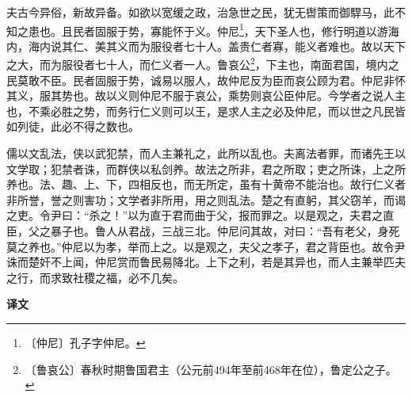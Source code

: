 \documentclass[12pt,UTF-8,openany,a4]{ctexbook}
\begin{document}
\begin{large}
    夫古今异俗，新故异备。如欲以宽缓之政，治急世之民，犹无辔策而御駻马，此不知之患也。且民者固服于势，寡能怀于义。仲尼\footnote{〔仲尼〕\yiwen 孔子字仲尼。}，天下圣人也，修行明道以游海内，海内说其仁、美其义而为服役者七十人。盖贵仁者寡，能义者难也。故以天下之大，而为服役者七十人，而仁义者一人。鲁哀公\footnote{〔鲁哀公〕\yiwen 春秋时期鲁国君主（公元前494年至前468年在位），鲁定公之子。}，下主也，南面君国，境内之民莫敢不臣。民者固服于势，诚易以服人，故仲尼反为臣而哀公顾为君。仲尼非怀其义，服其势也。故以义则仲尼不服于哀公，乘势则哀公臣仲尼。今学者之说人主也，不乘必胜之势，而务行仁义则可以王，是求人主之必及仲尼，而以世之凡民皆如列徒，此必不得之数也。
    
    儒以文乱法，侠以武犯禁，而人主兼礼之，此所以乱也。夫离法者罪，而诸先王以文学取；犯禁者诛，而群侠以私剑养。故法之所非，君之所取；吏之所诛，上之所养也。法、趣、上、下，四相反也，而无所定，虽有十黄帝不能治也。故行仁义者非所誉，誉之则害功；文学者非所用，用之则乱法。楚之有直躬，其父窃羊，而谒之吏。令尹曰：“杀之！”以为直于君而曲于父，报而罪之。以是观之，夫君之直臣，父之暴子也。鲁人从君战，三战三北。仲尼问其故，对曰：“吾有老父，身死莫之养也。”仲尼以为孝，举而上之。以是观之，夫父之孝子，君之背臣也。故令尹诛而楚奸不上闻，仲尼赏而鲁民易降北。上下之利，若是其异也，而人主兼举匹夫之行，而求致社稷之福，必不几矣。
\end{large}


\newpage

\begin{Large}
    \noindent\textbf{译文}
\end{Large}


\vspace{1em}
\end{document}
